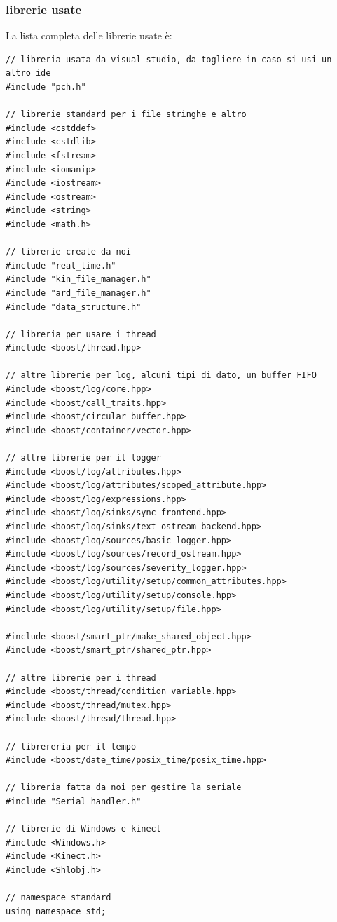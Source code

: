 \documentclass[10pt,a4paper]{article}
\begin{document}
\subsubsection{librerie usate}
La lista completa delle librerie usate \`e:
\begin{lstlisting}[style=mycpp, caption=librerie usate, captionpos=b]
// libreria usata da visual studio, da togliere in caso si usi un altro ide
#include "pch.h"

// librerie standard per i file stringhe e altro
#include <cstddef>
#include <cstdlib>
#include <fstream>
#include <iomanip>
#include <iostream>
#include <ostream>
#include <string>
#include <math.h>

// librerie create da noi
#include "real_time.h"
#include "kin_file_manager.h"
#include "ard_file_manager.h"
#include "data_structure.h"

// libreria per usare i thread
#include <boost/thread.hpp>

// altre librerie per log, alcuni tipi di dato, un buffer FIFO
#include <boost/log/core.hpp>
#include <boost/call_traits.hpp>
#include <boost/circular_buffer.hpp>
#include <boost/container/vector.hpp>

// altre librerie per il logger
#include <boost/log/attributes.hpp>
#include <boost/log/attributes/scoped_attribute.hpp>
#include <boost/log/expressions.hpp>
#include <boost/log/sinks/sync_frontend.hpp>
#include <boost/log/sinks/text_ostream_backend.hpp>
#include <boost/log/sources/basic_logger.hpp>
#include <boost/log/sources/record_ostream.hpp>
#include <boost/log/sources/severity_logger.hpp>
#include <boost/log/utility/setup/common_attributes.hpp>
#include <boost/log/utility/setup/console.hpp>
#include <boost/log/utility/setup/file.hpp>

#include <boost/smart_ptr/make_shared_object.hpp>
#include <boost/smart_ptr/shared_ptr.hpp>

// altre librerie per i thread 
#include <boost/thread/condition_variable.hpp>
#include <boost/thread/mutex.hpp>
#include <boost/thread/thread.hpp>

// librereria per il tempo
#include <boost/date_time/posix_time/posix_time.hpp>

// libreria fatta da noi per gestire la seriale
#include "Serial_handler.h"

// librerie di Windows e kinect 
#include <Windows.h>
#include <Kinect.h>
#include <Shlobj.h>

// namespace standard
using namespace std;
\end{lstlisting}
%
%
\end{document}
